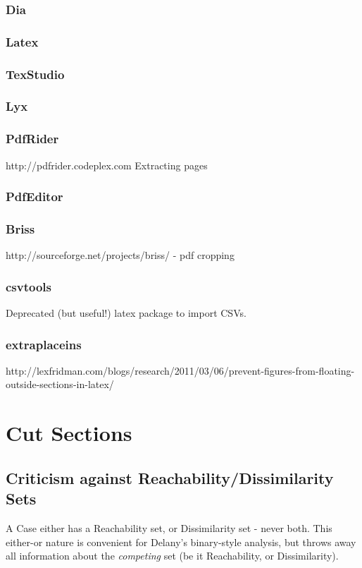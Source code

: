 \documentclass[a4paper,11pt]{report}
\begin{document}
\subsubsection*{Dia}
\subsubsection*{Latex}
\subsubsection*{TexStudio}

\subsubsection*{Lyx}




\subsubsection*{PdfRider}
http://pdfrider.codeplex.com
Extracting pages
\subsubsection*{PdfEditor}
\subsubsection*{Briss}
http://sourceforge.net/projects/briss/ - pdf cropping
\subsubsection*{csvtools}
Deprecated (but useful!) latex package to import CSVs.

\subsubsection*{extraplaceins}
http://lexfridman.com/blogs/research/2011/03/06/prevent-figures-from-floating-outside-sections-in-latex/

\section{Cut Sections}
\subsection{Criticism against Reachability/Dissimilarity Sets}
A Case either has a Reachability set, or Dissimilarity set - never both. This either-or nature is convenient for Delany's binary-style analysis, but throws away all information about the \emph{competing} set (be it Reachability, or Dissimilarity).
\end{document}

